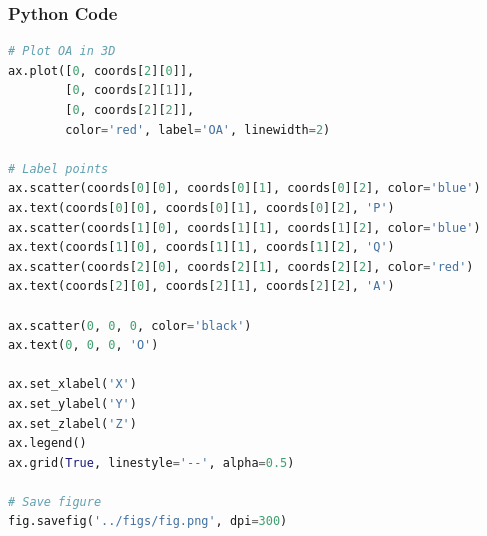 \documentclass{beamer}
\begin{document}
\begin{frame}[fragile]
    \frametitle{Python Code}
    \begin{lstlisting}[language=Python]
# Plot OA in 3D
ax.plot([0, coords[2][0]],
        [0, coords[2][1]],
        [0, coords[2][2]],
        color='red', label='OA', linewidth=2)

# Label points
ax.scatter(coords[0][0], coords[0][1], coords[0][2], color='blue')
ax.text(coords[0][0], coords[0][1], coords[0][2], 'P')
ax.scatter(coords[1][0], coords[1][1], coords[1][2], color='blue')
ax.text(coords[1][0], coords[1][1], coords[1][2], 'Q')
ax.scatter(coords[2][0], coords[2][1], coords[2][2], color='red')
ax.text(coords[2][0], coords[2][1], coords[2][2], 'A')

ax.scatter(0, 0, 0, color='black')
ax.text(0, 0, 0, 'O')

ax.set_xlabel('X')
ax.set_ylabel('Y')
ax.set_zlabel('Z')
ax.legend()
ax.grid(True, linestyle='--', alpha=0.5)

# Save figure
fig.savefig('../figs/fig.png', dpi=300)
    \end{lstlisting}
\end{frame}
\end{document}
